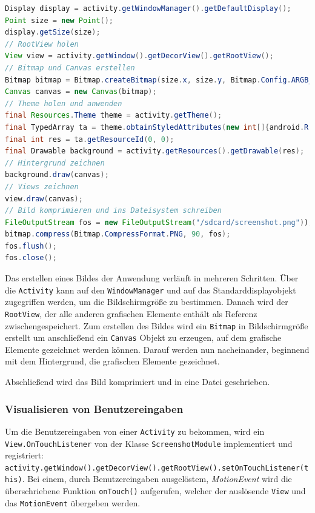 \begin{lstlisting}[label=lst:client_screenshot,language=Java, caption=Screenshot Aufnahme ohne Root-Zugriff]
Display display = activity.getWindowManager().getDefaultDisplay();
Point size = new Point();
display.getSize(size);
// RootView holen
View view = activity.getWindow().getDecorView().getRootView();
// Bitmap und Canvas erstellen
Bitmap bitmap = Bitmap.createBitmap(size.x, size.y, Bitmap.Config.ARGB_4444);
Canvas canvas = new Canvas(bitmap);
// Theme holen und anwenden
final Resources.Theme theme = activity.getTheme();
final TypedArray ta = theme.obtainStyledAttributes(new int[]{android.R.attr.windowBackground});
final int res = ta.getResourceId(0, 0);
final Drawable background = activity.getResources().getDrawable(res);
// Hintergrund zeichnen
background.draw(canvas);
// Views zeichnen
view.draw(canvas);
// Bild komprimieren und ins Dateisystem schreiben
FileOutputStream fos = new FileOutputStream("/sdcard/screenshot.png"));
bitmap.compress(Bitmap.CompressFormat.PNG, 90, fos);
fos.flush();
fos.close();
\end{lstlisting}

Das erstellen eines Bildes der Anwendung verläuft in mehreren Schritten.
Über die \texttt{Activity} kann auf den \texttt{WindowManager} und auf das Standarddisplayobjekt zugegriffen werden, um die Bildschirmgröße zu bestimmen.
Danach wird der \texttt{RootView}, der alle anderen grafischen Elemente enthält als Referenz zwischengespeichert.
Zum erstellen des Bildes wird ein \texttt{Bitmap} in Bildschirmgröße erstellt um anschließend ein \texttt{Canvas} Objekt zu erzeugen, auf dem grafische Elemente gezeichnet werden können.
Darauf werden nun nacheinander, beginnend mit dem Hintergrund, die grafischen Elemente gezeichnet.

Abschließend wird das Bild komprimiert und in eine Datei geschrieben.

\pagebreak

\subsubsection{Visualisieren von Benutzereingaben}
Um die Benutzereingaben von einer \texttt{Activity} zu bekommen, wird ein \texttt{View.OnTouchListener} von der Klasse \texttt{ScreenshotModule} implementiert und registriert:
\\
\texttt{activity.getWindow().getDecorView().getRootView().setOnTouchListener(this)}.
Bei einem, durch Benutzereingaben ausgelöstem, \emph{MotionEvent} wird die überschriebene Funktion \texttt{onTouch()} aufgerufen, welcher der auslösende \texttt{View} und das \texttt{MotionEvent} übergeben werden.


